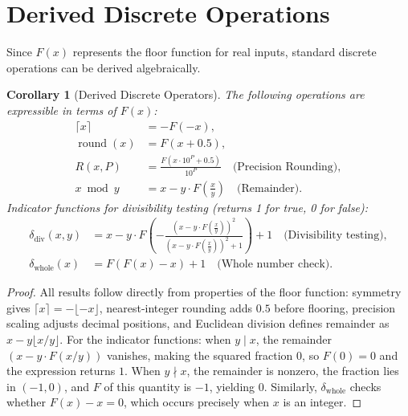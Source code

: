 \documentclass[12pt, a4paper]{article}
\theoremstyle{note}
\newtheorem{corollary}[theorem]{Corollary}
\begin{document}
\section{Derived Discrete Operations}
\label{sec:derived}

Since $F(x)$ represents the floor function for real inputs, standard discrete operations can be derived algebraically.

\begin{corollary}[Derived Discrete Operators]\label{cor:derived}
The following operations are expressible in terms of $F(x)$:
\begin{align}
\lceil x \rceil &= -F(-x), \\
\operatorname{round}(x) &= F(x + 0.5), \\
R(x, P) &= \frac{F(x \cdot 10^{P}+0.5)}{10^{P}} \quad \text{(Precision Rounding)}, \\
x \bmod y &= x - y \cdot F\!\left(\frac{x}{y}\right) \quad \text{(Remainder)}.
\end{align}
Indicator functions for divisibility testing (returns 1 for true, 0 for false):
\begin{align}
\delta_{\operatorname{div}}(x, y) &= x - y \cdot F\!\left(-\frac{\left(x-y\cdot F\!\left(\frac{x}{y}\right)\right)^{2}}{\left(x-y\cdot F\!\left(\frac{x}{y}\right)\right)^{2}+1}\right)+1 \quad \text{(Divisibility testing)}, \\
\delta_{\operatorname{whole}}(x) &= F\!\left(F(x)-x\right)+1 \quad \text{(Whole number check)}.
\end{align}
\end{corollary}

\begin{proof}
All results follow directly from properties of the floor function: symmetry gives $\lceil x \rceil = -\lfloor -x \rfloor$, nearest-integer rounding adds $0.5$ before flooring, precision scaling adjusts decimal positions, and Euclidean division defines remainder as $x - y\lfloor x/y \rfloor$. For the indicator functions: when $y \mid x$, the remainder $(x - y\cdot F(x/y))$ vanishes, making the squared fraction $0$, so $F(0) = 0$ and the expression returns $1$. When $y \nmid x$, the remainder is nonzero, the fraction lies in $(-1, 0)$, and $F$ of this quantity is $-1$, yielding $0$. Similarly, $\delta_{\operatorname{whole}}$ checks whether $F(x) - x = 0$, which occurs precisely when $x$ is an integer.
\end{proof}
\end{document}
